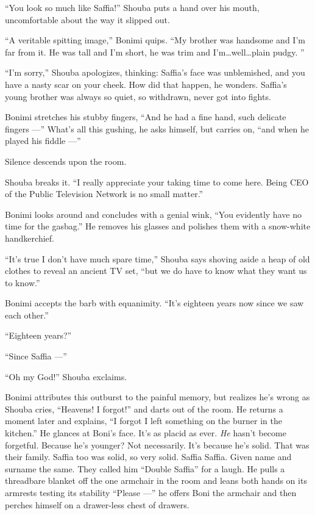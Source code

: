 \documentclass[twoside,11pt,openany]{book}
\begin{document}
``You look so much like Saffia!'' Shouba puts a hand over his mouth, uncomfortable about the
way it slipped out.

``A veritable spitting image,'' Bonimi quips. ``My brother was handsome and
I'm far from it. He was tall and I'm short, he was trim and I'm{\ldots}well{\ldots}plain pudgy. ''

``I'm sorry,'' Shouba apologizes, thinking: Saffia's face was unblemished,
and{ }you have a nasty scar on your cheek.  How did that happen,
he wonders. Saffia's young brother was always so quiet, so withdrawn, never got into fights.

Bonimi stretches his stubby fingers, ``And he had a fine hand, such delicate fingers ---''
What's all this gushing, he asks himself, but carries on, ``and when he played his fiddle ---''

Silence descends upon the room.

Shouba breaks it. ``I really appreciate your taking time to come here. Being CEO of the Public Television
Network is no small matter.''

Bonimi looks around and concludes with a genial wink, ``You evidently have no time for the
gasbag.'' He removes his glasses and polishes them with a snow-white handkerchief.

``It's true I don't have much spare time,'' Shouba says shoving aside a heap of old clothes to
reveal an ancient TV set, ``but we do have to know what they want us to know.''

Bonimi accepts the barb with equanimity. ``It's eighteen years now since we saw each other.''

``Eighteen years?''

``Since Saffia ---''

``Oh my God!'' Shouba exclaims.

Bonimi attributes this outburst to the painful memory, but realizes he's wrong as Shouba cries,
``Heavens!{ }I forgot!''
{ }and darts out of the room. He returns a moment later and explains,
``I forgot I left something on the burner in the kitchen.'' He glances at Boni's face. It's
as placid as ever. \textit{He} hasn't become forgetful. Because he's younger? Not necessarily. It's because he's solid.
That was their family. Saffia too was solid, so very solid. Saffia Saffia. Given name and surname the same. They called
him ``Double Saffia'' for a laugh. He pulls a threadbare blanket off the one armchair in the
room and leans both hands on its armrests testing its stability ``Please ---'' he offers Boni
the armchair and then perches himself on a drawer-less chest of drawers.
\end{document}
